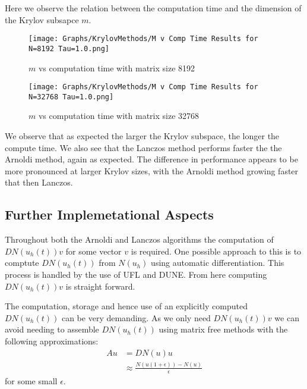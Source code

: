 Here we observe the relation between the computation time and the dimension of the Krylov subsapce $m$.
\begin{figure}[H]
    \centering
    \begin{minipage}{0.49\textwidth}
        \texttt{[image: Graphs/KrylovMethods/M v Comp Time Results for N=8192 Tau=1.0.png]} %
        \caption{$m$ vs computation time with matrix size 8192}
        \label{fig:mCTKrylov1}
    \end{minipage}\hfill
    \centering
    \begin{minipage}{0.49\textwidth}
        \texttt{[image: Graphs/KrylovMethods/M v Comp Time Results for N=32768 Tau=1.0.png]} %
        \caption{$m$ vs computation time with matrix size 32768}
        \label{fig:mCTKrylov2}
    \end{minipage}\hfill
\end{figure}
We observe that as expected the larger the Krylov subspace, the longer the compute time.
We also see that the Lanczos method performs faster the the Arnoldi method, again as expected.
The difference in performance appears to be more pronounced at larger Krylov sizes, with the Arnoldi method growing faster that then Lanczos.

\subsection{Further Implemetational Aspects}
Throughout both the Arnoldi and Lanczos algorithms the computation of $DN(u_h(t))v$ for some vector $v$ is required.
One possible approach to this is to comptute $DN(u_h(t))$ from $N(u_h)$ using automatic differentiation.
This process is handled by the use of UFL\cite{Alnaes2014} and DUNE\cite{Bastian2021}.
From here computing $DN(u_h(t))v$ is straight forward.

The computation, storage and hence use of an explicitly computed $DN(u_h(t))$ can be very demanding.
As we only need $DN(u_h(t))v$ we can avoid needing to assemble $DN(u_h(t))$ using matrix free methods with the following approximations:
\begin{align*}
    Au &= DN(u)u\\
    &\approx \frac{N(u(1+\epsilon))-N(u)}{\epsilon}
\end{align*}
for some small $\epsilon$.